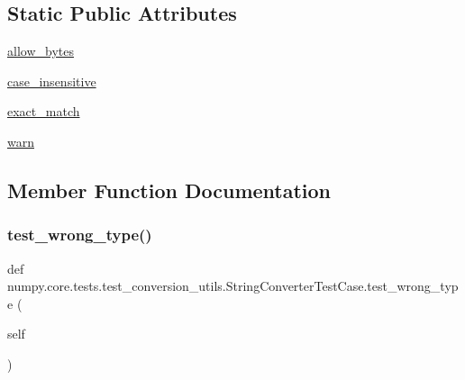 \subsection*{Static Public Attributes}
\begin{DoxyCompactItemize}
\item 
\hyperlink{classnumpy_1_1core_1_1tests_1_1test__conversion__utils_1_1StringConverterTestCase_a382948bd147caf8f17b9030ed28efdaf}{allow\+\_\+bytes}
\item 
\hyperlink{classnumpy_1_1core_1_1tests_1_1test__conversion__utils_1_1StringConverterTestCase_aed8d5ac1534fe35fa9aabcba79818e47}{case\+\_\+insensitive}
\item 
\hyperlink{classnumpy_1_1core_1_1tests_1_1test__conversion__utils_1_1StringConverterTestCase_a0a74ae65ea4b49424b64ec3350ae8d07}{exact\+\_\+match}
\item 
\hyperlink{classnumpy_1_1core_1_1tests_1_1test__conversion__utils_1_1StringConverterTestCase_ad2969b8c6b77ff310f5b401d72e93607}{warn}
\end{DoxyCompactItemize}


\subsection{Member Function Documentation}
\mbox{\label{classnumpy_1_1core_1_1tests_1_1test__conversion__utils_1_1StringConverterTestCase_aea50efe081489f123c7fe52c2770c914}} 
\subsubsection{\texorpdfstring{test\+\_\+wrong\+\_\+type()}{test\_wrong\_type()}}
{\footnotesize\ttfamily def numpy.\+core.\+tests.\+test\+\_\+conversion\+\_\+utils.\+String\+Converter\+Test\+Case.\+test\+\_\+wrong\+\_\+type (\begin{DoxyParamCaption}\item[{}]{self }\end{DoxyParamCaption})}

